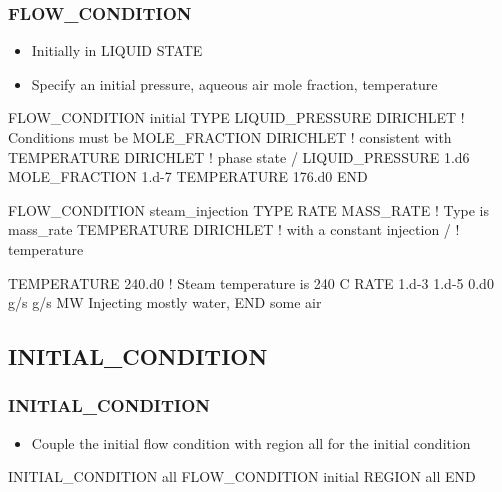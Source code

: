 \documentclass{beamer}
\newcommand\redcomment[1]{{{\color{red} #1}}}
\newcommand\bluecomment[1]{{{\color{blue} #1}}}
\newcommand\greencomment[1]{{{\color{green} #1}}}
\begin{document}
\begin{frame}\frametitle{FLOW\_CONDITION}

\begin{itemize}
\item Initially in \redcomment{LIQUID STATE}
\item Specify an initial pressure, aqueous air mole fraction, temperature
\end{itemize}

\begin{semiverbatim}
FLOW_CONDITION initial 
  TYPE
    LIQUID_PRESSURE DIRICHLET \bluecomment{! Conditions must be}
    MOLE_FRACTION DIRICHLET   \bluecomment{! consistent with}
    TEMPERATURE DIRICHLET     \bluecomment{! phase state}
  /
  LIQUID_PRESSURE 1.d6
  MOLE_FRACTION 1.d-7
  TEMPERATURE 176.d0
END                      

\newpage

FLOW_CONDITION steam_injection 
  TYPE
    RATE MASS_RATE         \bluecomment{! Type is \redcomment{mass_rate}}
    TEMPERATURE DIRICHLET  \bluecomment{! with a constant injection}
  /                        \bluecomment{! temperature}

  TEMPERATURE 240.d0       \bluecomment{! Steam temperature is 240 C}     
  RATE 1.d-3 1.d-5 0.d0 g/s g/s MW \bluecomment{Injecting mostly water,}
END                                \bluecomment{some air}
\end{semiverbatim}

\end{frame}

\subsection{INITIAL\_CONDITION}

\begin{frame}[fragile]\frametitle{INITIAL\_CONDITION}

\begin{itemize}
\item Couple the \greencomment{initial} flow condition with region \greencomment{all} for the initial condition
\end{itemize}

\begin{semiverbatim}

INITIAL_CONDITION all 
  FLOW_CONDITION initial
  REGION all
END

\end{semiverbatim}

\end{frame}
\end{document}
